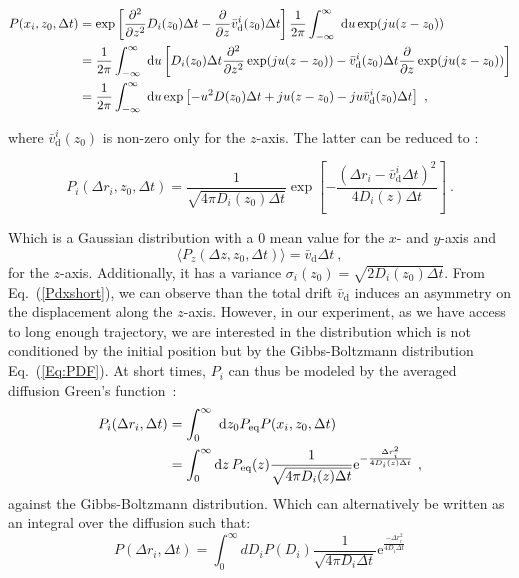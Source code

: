 \begin{equation}
	\begin{aligned}
		P(x_i, z_0, \Delta t) &= \exp \left[  \frac{\partial ^2}{\partial z ^2} D_i(z_0) \Delta t - \frac{\partial}{\partial z} \bar{v}^i _\mathrm{d} (z_0) \Delta t \right] \frac{1}{2 \pi} \int _{-\infty} ^{\infty} ~ \textnormal{d}u \exp (ju(z-z_0))  \\
		&= \frac{1}{2\pi} \int _{-\infty} ^{\infty} ~ \textnormal{d}u  \left[ D_i(z_0) \Delta t \frac{\partial ^2}{\partial z ^2} \exp (ju(z-z_0)) -  \bar{v}^i _\mathrm{d} (z_0) \Delta t \frac{\partial}{\partial z} \exp (ju(z-z_0)) \right] \\
		& = \frac{1}{2\pi} \int_{-\infty}^{\infty} ~ \textnormal{d}u \exp \left[ -u^2 D(z_0)\Delta t + ju(z-z_0) - ju  \bar{v}^i _\mathrm{d} (z_0) \Delta t \right] ~,
	\end{aligned}
\end{equation}

where $ \bar{v}^i _\mathrm{d} (z_0)$ is non-zero only for the $z$-axis. The latter can be reduced to \cite{matse_state-dependent_nodate, risken_fokker-planck_2012}:

\begin{equation}
	P_i(\Delta r_i, z_0, \Delta t) =   \frac{1}{\sqrt{4 \pi D_i(z_0) \Delta t}} \exp \left[-\frac{(\Delta r_i - \bar{v}^i_\mathrm{d}\Delta t)^2}{4 D_i(z) \Delta t}   \right]\ .
	\label{Pdxshort}
\end{equation}

Which is a Gaussian distribution with a 0 mean value for the $x$- and $y$-axis and  
\begin{equation}
	\langle P_z(\Delta z, z_0, \Delta t) \rangle = \bar{v}_\mathrm{d} \Delta t ~,
\end{equation}
for the $z$-axis. Additionally, it has a variance $\sigma_i(z_0) = \sqrt{2D_i (z_0) \Delta t}$. From Eq.~(\ref{Pdxshort}), we can observe than the total drift $\bar{v}_\mathrm{d}$ induces an asymmetry on the displacement along the $z$-axis. However, in our experiment, as we have access to long enough trajectory, we are interested in the distribution which is not conditioned by the initial position but by the Gibbs-Boltzmann distribution Eq.~(\ref{Eq:PDF}). At short times, $P_i$ can thus be modeled by the averaged diffusion Green's function~\cite{matse_test_2017,hapca_anomalous_2009}:
\begin{equation}
	\begin{aligned}
		P_i(\Delta r_i, \Delta t) & = \int _{0} ^\infty ~\textnormal{d} z_0 P_\mathrm{eq}  P(x_i, z_0, \Delta t) \\
		&= \int ^\infty _0 \mathrm{d}z\, P_{\textrm{eq}}(z) \frac{1}{\sqrt{4 \pi D_i(z) \Delta t}} \textrm{e}^{-\frac{\Delta r_i^2}{4 D_i(z) \Delta t}     }\ ,
	\end{aligned}
	\label{Eq:PDzshort}
\end{equation}
against the Gibbs-Boltzmann distribution. Which can alternatively be written as an integral over the diffusion such that:
\begin{equation}
	P(\Delta r_i , \Delta t) = \int_0 ^\infty dD_iP(D_i) \frac{1}{\sqrt{4 \pi D_i \Delta t}} \mathrm{e} ^{\frac{-\Delta r_i ^2}{4D_i\Delta t}} 
\end{equation}

